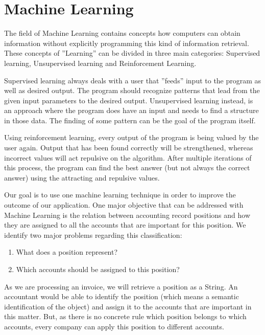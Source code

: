%
% 
\chapter{Machine Learning}
\label{cha4}

The field of Machine Learning contains concepts how computers can obtain information without explicitly programming this kind of information retrieval. These concepts of ''Learning'' can be divided in three main categories: Supervised learning, Unsupervised learning and Reinforcement Learning.

Supervised learning always deals with a user that ''feeds'' input to the program as well as desired output. The program should recognize patterns that lead from the given input parameters to the desired output.
Unsupervised learning instead, is an approach where the program does have an input and needs to find a structure in those data. The finding of some pattern can be the goal of the program itself.

Using reinforcement learning, every output of the program is being valued by the user again. Output that has been found correctly will be strengthened, whereas incorrect values will act repulsive on the algorithm. After multiple iterations of this process, the program can find the best answer (but not always the correct answer) using the attracting and repulsive values.

Our goal is to use one machine learning technique in order to improve the outcome of our application. One major objective that can be addressed with Machine Learning is the relation between accounting record positions and how they are assigned to all the accounts that are important for this position.
We identify two major problems regarding this classification:
\begin{enumerate}
         \item What does a position represent?
         \item Which accounts should be assigned to this position?
\end{enumerate}
As we are processing an invoice, we will retrieve a position as a String. An accountant would be able to identify the position (which means a semantic identification of the object) and assign it to the accounts that are important in this matter. But, as there is no concrete rule which position belongs to which accounts, every company can apply this position to different accounts.

